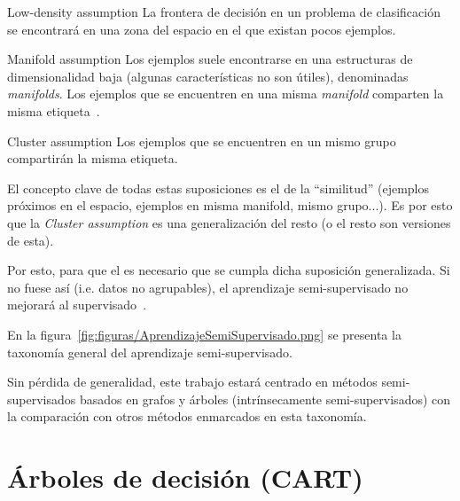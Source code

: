 \begin{mainbox}{Low-density assumption}
    La frontera de decisión en un problema de clasificación se encontrará en una zona del espacio
    en el que existan pocos ejemplos.
\end{mainbox}

\medskip

\begin{mainbox}{Manifold assumption}
    Los ejemplos suele encontrarse en una estructuras de dimensionalidad baja (algunas características
    no son útiles), denominadas \emph{manifolds}. Los ejemplos que se encuentren en una misma \emph{manifold} comparten la misma etiqueta~\cite{towardsdatascience:semi,vanEngelen2020}.
    \label{manifold}
\end{mainbox}

\medskip

\begin{mainbox}{Cluster assumption}
    Los ejemplos que se encuentren en un mismo grupo compartirán la misma etiqueta.
\end{mainbox}


El concepto clave de todas estas suposiciones es el de la ``similitud'' 
(ejemplos próximos en el espacio, ejemplos en misma manifold, mismo grupo...). 
Es por esto que la \textit{Cluster assumption} es una generalización del
resto (o el resto son versiones de esta).

Por esto, para que el 
es necesario que se cumpla dicha suposición generalizada. Si no fuese así (i.e. datos no agrupables),
el aprendizaje semi-supervisado no mejorará al supervisado~\cite{vanEngelen2020}.

En la figura~\ref{fig:figuras/AprendizajeSemiSupervisado.png} se presenta la taxonomía general del aprendizaje semi-supervisado.


Sin pérdida de generalidad, este trabajo estará centrado en métodos semi-supervisados basados en grafos y árboles (intrínsecamente semi-supervisados) con la comparación con otros métodos enmarcados en esta taxonomía.

\clearpage
\section{Árboles de decisión (CART)}
\label{cart}

